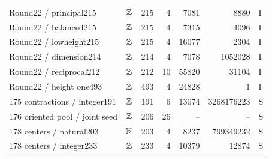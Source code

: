 \begin{longtable}{@{}p{43mm}crrrrl@{}}
Round22 / principal215 & $\mathbb Z$ & 215 & 4 & 7081 & 8880 & I\\
Round22 / balanced215 & $\mathbb Z$ & 215 & 4 & 7315 & 4096 & I\\
Round22 / lowheight215 & $\mathbb Z$ & 215 & 4 & 16077 & 2304 & I\\
Round22 / dimension214 & $\mathbb Z$ & 214 & 4 & 7078 & 1052028 & I\\
Round22 / reciprocal212 & $\mathbb Z$ & 212 & 10 & 55820 & 31104 & I\\
Round22 / height one493 & $\mathbb Z$ & 493 & 4 & 24828 & 1 & I\\
175 contractions / integer191 & $\mathbb Z$ & 191 & 6 & 13074 & 3268176223 & S\\
176 oriented pool / joint seed & $\mathbb Z$ & 206 & 26 & -- & -- & S\\
178 centers / natural203 & $\mathbb N$ & 203 & 4 & 8237 & 799349232 & S\\
178 centers / integer233 & $\mathbb Z$ & 233 & 4 & 10379 & 12874 & S\\
\end{longtable}\endgroup
